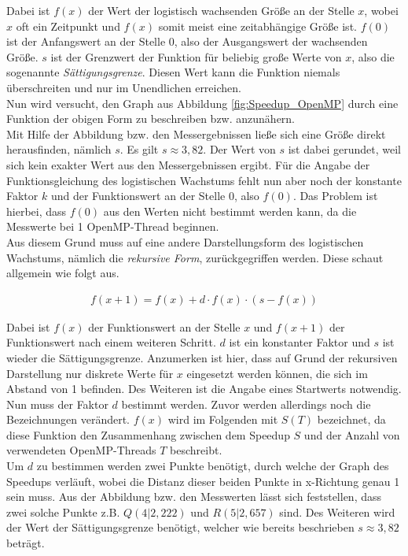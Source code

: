 \begin{description}
						Dabei ist $f(x)$ der Wert der logistisch wachsenden Größe an der Stelle $x$, wobei $x$ oft ein Zeitpunkt und $f(x)$ somit meist eine zeitabhängige Größe ist. $f(0)$ ist der Anfangswert an der Stelle 0, also der Ausgangswert der wachsenden Größe. $s$ ist der Grenzwert der Funktion für beliebig große Werte von $x$, also die sogenannte \textit{Sättigungsgrenze}. Diesen Wert kann die Funktion niemals überschreiten und nur im Unendlichen erreichen. \cite{MathematikTechnischeAnwendungen2} \cite{LogistischesWachstum}\\		
						Nun wird versucht, den Graph aus Abbildung \ref{fig:Speedup_OpenMP} durch eine Funktion der obigen Form zu beschreiben bzw. anzunähern.\\
						Mit Hilfe der Abbildung bzw. den Messergebnissen ließe sich eine Größe direkt herausfinden, nämlich $s$. Es gilt $s \approx 3,82$. Der Wert von $s$ ist dabei gerundet, weil sich kein exakter Wert aus den Messergebnissen ergibt. Für die Angabe der Funktionsgleichung des logistischen Wachstums fehlt nun aber noch der konstante Faktor $k$ und der Funktionswert an der Stelle 0, also $f(0)$. Das Problem ist hierbei, dass $f(0)$ aus den Werten nicht bestimmt werden kann, da die Messwerte bei 1 OpenMP-Thread beginnen.\\
						Aus diesem Grund muss auf eine andere Darstellungsform des logistischen Wachstums, nämlich die \textit{rekursive Form}, zurückgegriffen werden. Diese schaut allgemein wie folgt aus.
						
						\begin{align*} 
							f(x + 1) = f(x) + d \cdot f(x) \cdot (s - f(x))
						\end{align*}
						
						Dabei ist $f(x)$ der Funktionswert an der Stelle $x$ und $f(x + 1)$ der Funktionswert nach einem weiteren Schritt. $d$ ist ein konstanter Faktor und $s$ ist wieder die Sättigungsgrenze. Anzumerken ist hier, dass auf Grund der rekursiven Darstellung nur diskrete Werte für $x$ eingesetzt werden können, die sich im Abstand von 1 befinden. Des Weiteren ist die Angabe eines Startwerts notwendig. \cite{LogistischesWachstumRekursiv}\\
						Nun muss der Faktor $d$ bestimmt werden. Zuvor werden allerdings noch die Bezeichnungen verändert. $f(x)$ wird im Folgenden mit $S(T)$ bezeichnet, da diese Funktion den Zusammenhang zwischen dem Speedup $S$ und der Anzahl von verwendeten OpenMP-Threads $T$ beschreibt.\\
						Um $d$ zu bestimmen werden zwei Punkte benötigt, durch welche der Graph des Speedups verläuft, wobei die Distanz dieser beiden Punkte in x-Richtung genau 1 sein muss. Aus der Abbildung bzw. den Messwerten lässt sich feststellen, dass zwei solche Punkte z.B. $Q(4 | 2,222)$ und $R(5 | 2,657)$ sind. Des Weiteren wird der Wert der Sättigungsgrenze benötigt, welcher wie bereits beschrieben $s \approx 3,82$ beträgt.


\end{description}
